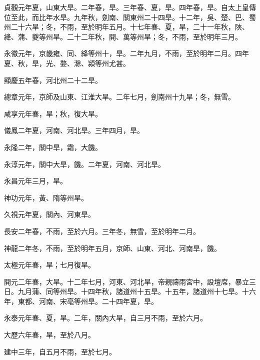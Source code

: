 \begin{pinyinscope}
 貞觀元年夏，山東大旱。二年春，旱。三年春、夏，旱。四年春，旱。自太上皇傳位至此，而比年水旱。九年秋，劍南、關東州二十四旱。十二年，吳、楚、巴、蜀州二十六旱；冬，不雨，至於明年五月。十七年春、夏，旱，二十一年秋，陜、絳、蒲、夔等州旱。二十二年秋，開、萬等州旱；冬，不雨，至於明年三月。



 永徽元年，京畿雍、同、絳等州十，旱。二年九月，不雨，至於明年二月。四年夏、秋，旱，光、婺、滁、潁等州尤甚。



 顯慶五年春，河北州二十二旱。



 總章元年，京師及山東、江淮大旱。二年七月，劍南州十九旱；冬，無雪。



 咸享元年春，旱；秋，復大旱。



 儀鳳二年夏，河南、河北旱。三年四月，旱。



 永隆二年，關中旱，霜，大饑。



 永淳元年，關中大旱，饑。二年夏，河南、河北旱。



 永昌元年三月，旱。



 神功元年，黃、隋等州旱。



 久視元年夏，關內、河東旱。



 長安二年春，不雨，至於六月。三年冬，無雪，至於明年二月。



 神龍二年冬，不雨，至於明年五月，京師、山東、河北、河南旱，饑。



 太極元年春，旱；七月復旱。



 開元二年春，大旱。十二年七月，河東、河北旱，帝親禱雨宮中，設壇席，暴立三日。九月蒲、同等州旱。十四年秋，諸道州十五旱。十五年，諸道州十七旱。十六年，東都、河南、宋亳等州旱。二十四年夏，旱。



 永泰元年春、夏，旱。二年，關內大旱，自三月不雨，至於六月。



 大歷六年春，旱，至於八月。



 建中三年，自五月不雨，至於七月。




\end{pinyinscope}
